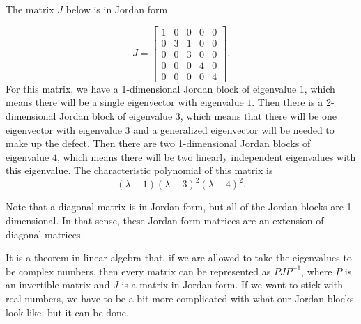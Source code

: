 \documentclass{ximera}
\begin{document}
\begin{example}
    The matrix $J$ below is in Jordan form
    \begin{center}
    \end{center}
    
    \[ 
        J = 
        \begin{bmatrix} 
            1 & 0 & 0 & 0 & 0 \\ 
            0 & 3 & 1 & 0 & 0 \\ 
            0 &0 & 3 &0 &0 \\ 
            0 & 0 & 0 &4& 0 \\ 
            0 & 0 & 0 & 0 & 4 
        \end{bmatrix}.
    \] 
    For this matrix, we have a 1-dimensional Jordan block of eigenvalue $1$, which means there will be a single eigenvector with eigenvalue $1$. Then there is a 2-dimensional Jordan block of eigenvalue $3$, which means that there will be one eigenvector with eigenvalue $3$ and a generalized eigenvector will be needed to make up the defect. Then there are two 1-dimensional Jordan blocks of eigenvalue $4$, which means there will be two linearly independent eigenvalues with this eigenvalue. The characteristic polynomial of this matrix is
    \[ 
        (\lambda - 1)(\lambda-3)^2(\lambda-4)^2. 
    \]
\end{example}

\begin{remark}
    Note that a diagonal matrix is in Jordan form, but all of the Jordan blocks are 1-dimensional. In that sense, these Jordan form matrices are an extension of diagonal matrices. 
\end{remark}

It is a theorem in linear algebra that, if we are allowed to take the eigenvalues to be complex numbers, then every matrix can be represented as $PJP^{-1}$, where $P$ is an invertible matrix and $J$ is a matrix in Jordan form. If we want to stick with real numbers, we have to be a bit more complicated with what our Jordan blocks look like, but it can be done. 
\end{document}
